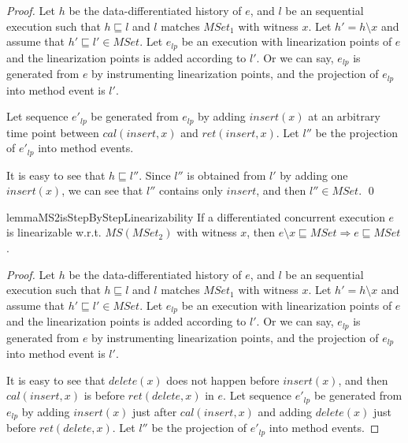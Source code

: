 {\begin {proof}
Let $h$ be the data-differentiated history of $e$, and $l$ be an sequential execution such that $h \sqsubseteq l$ and $l$ matches $\textit{MSet}_1$ with witness $x$. Let $h'=h \setminus x$ and assume that $h' \sqsubseteq l' \in \textit{MSet}$. Let $e_{\textit{lp}}$ be an execution with linearization points of $e$ and the linearization points is added according to $l'$. Or we can say, $e_{\textit{lp}}$ is generated from $e$ by instrumenting linearization points, and the projection of $e_{\textit{lp}}$ into method event is $l'$.

Let sequence $e'_{\textit{lp}}$ be generated from $e_{\textit{lp}}$ by adding $\textit{insert}(x)$ at an arbitrary time point between $\textit{cal}(\textit{insert},x)$ and $\textit{ret}(\textit{insert},x)$. Let $l''$ be the projection of $e'_{\textit{lp}}$ into method events.

It is easy to see that $h \sqsubseteq l''$. Since $l''$ is obtained from $l'$ by adding one $\textit{insert}(x)$, we can see that $l''$ contains only $\textit{insert}$, and then $l'' \in \textit{MSet}$. \qed
\end {proof}


\begin{restatable}{lemma}{MS2isStepByStepLinearizability}
\label{lemma:MS2 is step-by-step linearizability}
If a differentiated concurrent execution $e$ is linearizable w.r.t. $\textit{MS}(\textit{MSet}_2)$ with witness $x$, then $e \setminus x \sqsubseteq \textit{MSet} \Rightarrow e \sqsubseteq \textit{MSet}$.
\end{restatable}

\begin {proof}
Let $h$ be the data-differentiated history of $e$, and $l$ be an sequential execution such that $h \sqsubseteq l$ and $l$ matches $\textit{MSet}_1$ with witness $x$. Let $h'=h \setminus x$ and assume that $h' \sqsubseteq l' \in \textit{MSet}$. Let $e_{\textit{lp}}$ be an execution with linearization points of $e$ and the linearization points is added according to $l'$. Or we can say, $e_{\textit{lp}}$ is generated from $e$ by instrumenting linearization points, and the projection of $e_{\textit{lp}}$ into method event is $l'$.

It is easy to see that $\textit{delete}(x)$ does not happen before $\textit{insert}(x)$, and then $\textit{cal}(\textit{insert},x)$ is before $\textit{ret}(\textit{delete},x)$ in $e$. Let sequence $e'_{\textit{lp}}$ be generated from $e_{\textit{lp}}$ by adding $\textit{insert}(x)$ just after $\textit{cal}(\textit{insert},x)$ and adding $\textit{delete}(x)$ just before $\textit{ret}(\textit{delete},x)$. Let $l''$ be the projection of $e'_{\textit{lp}}$ into method events.


\end{proof}}
